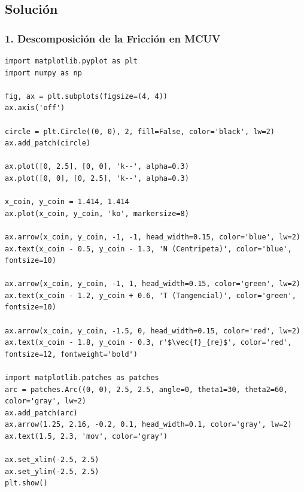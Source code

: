 \documentclass[12pt, a4paper]{article}
\begin{document}
\subsection*{Solución}

\subsubsection*{1. Descomposición de la Fricción en MCUV}

\begin{verbatim}
import matplotlib.pyplot as plt
import numpy as np

fig, ax = plt.subplots(figsize=(4, 4))
ax.axis('off')

circle = plt.Circle((0, 0), 2, fill=False, color='black', lw=2)
ax.add_patch(circle)

ax.plot([0, 2.5], [0, 0], 'k--', alpha=0.3)
ax.plot([0, 0], [0, 2.5], 'k--', alpha=0.3)

x_coin, y_coin = 1.414, 1.414
ax.plot(x_coin, y_coin, 'ko', markersize=8)

ax.arrow(x_coin, y_coin, -1, -1, head_width=0.15, color='blue', lw=2)
ax.text(x_coin - 0.5, y_coin - 1.3, 'N (Centripeta)', color='blue', fontsize=10)

ax.arrow(x_coin, y_coin, -1, 1, head_width=0.15, color='green', lw=2)
ax.text(x_coin - 1.2, y_coin + 0.6, 'T (Tangencial)', color='green', fontsize=10)

ax.arrow(x_coin, y_coin, -1.5, 0, head_width=0.15, color='red', lw=2)
ax.text(x_coin - 1.8, y_coin - 0.3, r'$\vec{f}_{re}$', color='red', fontsize=12, fontweight='bold')

import matplotlib.patches as patches
arc = patches.Arc((0, 0), 2.5, 2.5, angle=0, theta1=30, theta2=60, color='gray', lw=2)
ax.add_patch(arc)
ax.arrow(1.25, 2.16, -0.2, 0.1, head_width=0.1, color='gray', lw=2)
ax.text(1.5, 2.3, 'mov', color='gray')

ax.set_xlim(-2.5, 2.5)
ax.set_ylim(-2.5, 2.5)
plt.show()
\end{verbatim}
\end{document}

